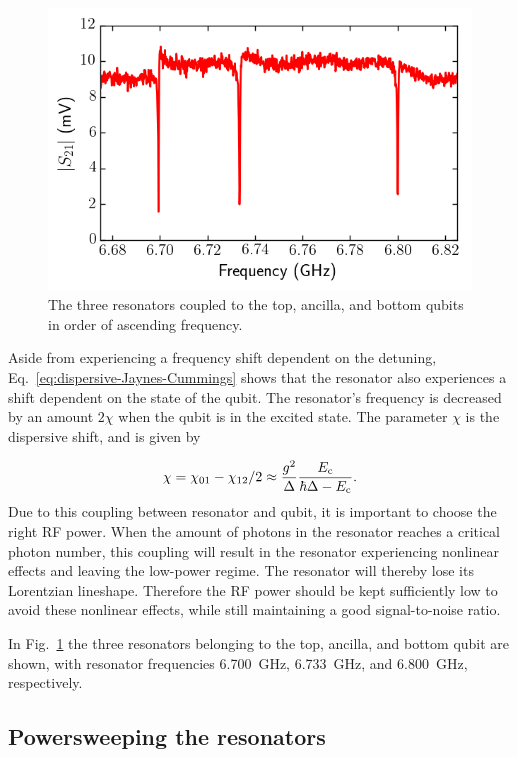         \begin{figure}[h]
          \centering
          \includegraphics[width=.7\textwidth]{Figures/Qubit characterization/Resonator scans.png}
          \caption{The three resonators coupled to the top, ancilla, and bottom qubits in order of ascending frequency.}
          \label{fig:Three resonators}
        \end{figure}

        Aside from experiencing a frequency shift dependent on the detuning, Eq.~\ref{eq:dispersive-Jaynes-Cummings} shows that the resonator also experiences a shift dependent on the state of the qubit. The resonator's frequency is decreased by an amount $2 \chi$ when the qubit is in the excited state. The parameter $\chi$ is the dispersive shift, and is given by

        \begin{equation}
          \chi = \chi_{01} - \chi_{12}/2 \approx \frac{g^2}{\Delta}\frac{E_\text{c}}{\hbar \Delta - E_\text{c}}.
          \label{eq:dispersive-shift}
        \end{equation}
        Due to this coupling between resonator and qubit, it is important to choose the right RF power. When the amount of photons in the resonator reaches a critical photon number, this coupling will result in the resonator experiencing nonlinear effects and leaving the low-power regime. The resonator will thereby lose its Lorentzian lineshape. Therefore the RF power should be kept sufficiently low to avoid these nonlinear effects, while still maintaining a good signal-to-noise ratio.

        In Fig.~\ref{fig:Three resonators} the three resonators belonging to the top, ancilla, and bottom qubit are shown, with resonator frequencies \SI{6.700}{\giga \hertz}, \SI{6.733}{\giga \hertz}, and \SI{6.800}{\giga \hertz}, respectively.


      \subsection{Powersweeping the resonators}
        \label{ssec:powersweep}

